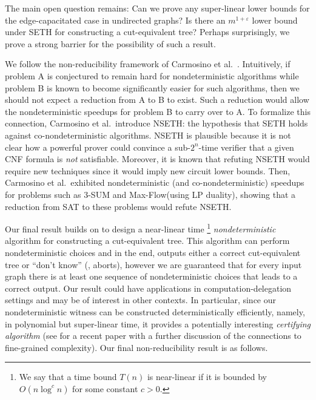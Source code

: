\documentclass{toc}
\theoremstyle{plain}
\newcommand{\ProblemName}[1]{\textsf{#1}}
\newcommand{\MF}{\ProblemName{Max-Flow}\xspace}
\newcommand{\SETH}{SETH\xspace}
\newcommand{\NSETH}{NSETH\xspace}
\newcommand\eps{\varepsilon}
\begin{document}
%



\medskip

The main open question remains: Can we prove any super-linear lower bounds for the edge-capacitated case in undirected graphs? Is there an $m^{1+\eps}$ lower bound under \SETH for constructing a cut-equivalent tree?
Perhaps surprisingly, we prove a strong barrier for the possibility of such a result.

We follow the non-reducibility framework of Carmosino et al.~\cite{carmosino2016nondeterministic}.
Intuitively, if problem A is conjectured to remain hard for nondeterministic algorithms while problem B is known to become significantly easier for such algorithms, then we should not expect a reduction from A to B to exist. Such a reduction would allow the nondeterministic speedups for problem B to carry over to A.
To formalize this connection, Carmosino et al.\ introduce \NSETH: the hypothesis that \SETH holds against co-nondeterministic algorithms.
\NSETH is plausible because it is not clear how a powerful prover could convince a sub-$2^{n}$-time verifier that a given CNF formula is \emph{not} satisfiable.
Moreover, it is known that refuting \NSETH
%
would require  %
new techniques since it
%
would imply  %
new circuit lower bounds.
Then, Carmosino et al.\ exhibited nondeterministic (and co-nondeterministic) speedups for problems such as $3$-SUM and \MF (using LP duality), showing that a reduction from SAT to these problems would refute \NSETH.

Our final result builds on  to design
a near-linear time%
\footnote{We say that a time bound $T(n)$ is near-linear
  if it is bounded by $O(n\log^c n)$ for some constant $c>0$.
}
\emph{nondeterministic} algorithm for constructing a cut-equivalent tree.
This algorithm can perform nondeterministic choices and in the end,
outputs either a correct cut-equivalent tree or ``don't know'' (\ie, aborts),
however we are guaranteed that for every input graph there is at least one sequence of nondeterministic choices that leads to a correct output.
Our result could have applications in computation-delegation settings and may be of interest in other contexts.
In particular, since our nondeterministic witness can be constructed deterministically efficiently, namely, in polynomial but super-linear time,
it provides a potentially interesting \emph{certifying algorithm} \cite{certify_survey11,alkassar2011verification} (see \cite{Kunnemann18} for a recent paper with a further discussion of the connections to fine-grained complexity).
Our final non-reducibility result is as follows.
\end{document}
